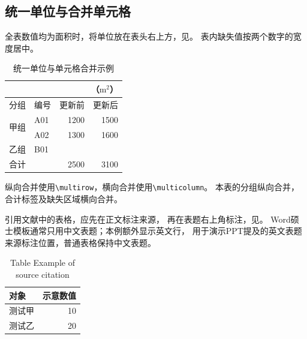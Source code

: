 \documentclass{lunwen}
\newlength{\queshikuan}
\newcommand{\queshizhi}{\makebox[\queshikuan][c]{—}}
\begin{document}
\subsection{统一单位与合并单元格}
全表数值均为面积时，将单位放在表头右上方，见。
表内缺失值按两个数字的宽度居中。

\begin{table}[htbp]
 \centering\tablefont
 \settowidth{\queshikuan}{00}
 \caption{统一单位与单元格合并示例}\label{tab:danwei}
 \begin{tabularx}{\linewidth}{lXrr}
  \multicolumn{4}{r}{（$\mathrm{m}^2$）}\\
  \toprule 分组 & 编号 & 更新前 & 更新后\\\midrule
  \multirow{2}{*}{甲组} & A01 & 1200 & 1500\\
   & A02 & 1300 & 1600\\
  乙组 & B01 & \multicolumn{2}{c}{\queshizhi}\\
  \multicolumn{2}{l}{合计} & 2500 & 3100\\
  \bottomrule
 \end{tabularx}
\end{table}

纵向合并使用\verb|\multirow|，横向合并使用\verb|\multicolumn|。
本表的分组纵向合并，合计标签及缺失区域横向合并。

引用文献中的表格，应先在正文标注来源\cite{case-journal}，
再在表题右上角标注，见。
Word硕士模板通常只用中文表题；本例额外显示英文行，
用于演示PPT提及的英文表题来源标注位置，普通表格保持中文表题。

\begin{table}[htbp]
 \centering\tablefont
 \caption{引用表题格式示例\cite{case-journal}}\label{tab:yinyong}
 \caption*{Table \thetable\quad Example of source citation\cite{case-journal}}
 \begin{tabularx}{\linewidth}{Xr}
  \toprule 对象 & 示意数值\\\midrule
  测试甲 & 10\\
  测试乙 & 20\\\bottomrule
 \end{tabularx}
\end{table}


\clearpage
\end{document}
